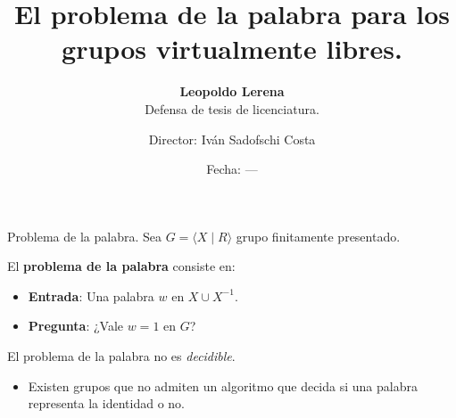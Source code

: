 \documentclass[aspectratio=169, 10pt]{beamer}
\title{El problema de la palabra para los grupos virtualmente libres.}
\subtitle{\textbf{Leopoldo Lerena} \\
		Defensa de tesis de licenciatura.}
\date{Fecha: ---}
\author{Director: Iván Sadofschi Costa}
\institute{Universidad de Buenos Aires}
\begin{document}
	\maketitle

	
	
	
	\begin{frame}[fragile]{Problema de la palabra.}
		Sea $ G = \langle X \mid R \rangle$ grupo finitamente presentado.
		
		\pause 

		El \textbf{problema de la palabra} consiste en:
		\pause 
		\begin{itemize}
					\item 
						\textbf{Entrada}: Una palabra $w$ en $X \cup X^{-1}$.
					\pause 
					\item 
						\textbf{Pregunta}: ¿Vale $w=1$ en $G$?
		\end{itemize}
		\pause 

		El problema de la palabra no es \emph{decidible}.
		\pause 
		\begin{itemize}
			\item 
				Existen grupos que no admiten un algoritmo que decida si una palabra representa la identidad o no.
		\end{itemize}
		
		
	\end{frame}
\end{document}
